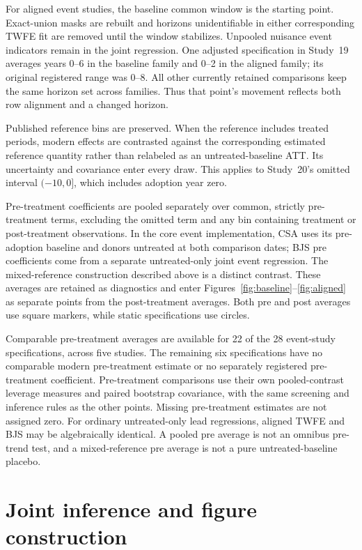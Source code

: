 \documentclass[11pt,letterpaper]{article}
\begin{document}
For aligned event studies, the baseline common window is the starting point. Exact-union masks are rebuilt and horizons unidentifiable in either corresponding TWFE fit are removed until the window stabilizes. Unpooled nuisance event indicators remain in the joint regression. One adjusted specification in Study~19 averages years 0--6 in the baseline family and 0--2 in the aligned family; its original registered range was 0--8. All other currently retained comparisons keep the same horizon set across families. Thus that point's movement reflects both row alignment and a changed horizon.

Published reference bins are preserved. When the reference includes treated periods, modern effects are contrasted against the corresponding estimated reference quantity rather than relabeled as an untreated-baseline ATT. Its uncertainty and covariance enter every draw. This applies to Study~20's omitted interval $(-10,0]$, which includes adoption year zero.

Pre-treatment coefficients are pooled separately over common, strictly pre-treatment terms, excluding the omitted term and any bin containing treatment or post-treatment observations. In the core event implementation, CSA uses its pre-adoption baseline and donors untreated at both comparison dates; BJS pre coefficients come from a separate untreated-only joint event regression. The mixed-reference construction described above is a distinct contrast. These averages are retained as diagnostics and enter Figures~\ref{fig:baseline}--\ref{fig:aligned} as separate points from the post-treatment averages. Both pre and post averages use square markers, while static specifications use circles.

Comparable pre-treatment averages are available for 22 of the 28 event-study specifications, across five studies. The remaining six specifications have no comparable modern pre-treatment estimate or no separately registered pre-treatment coefficient. Pre-treatment comparisons use their own pooled-contrast leverage measures and paired bootstrap covariance, with the same screening and inference rules as the other points. Missing pre-treatment estimates are not assigned zero. For ordinary untreated-only lead regressions, aligned TWFE and BJS may be algebraically identical. A pooled pre average is not an omnibus pre-trend test, and a mixed-reference pre average is not a pure untreated-baseline placebo.

\section{Joint inference and figure construction}
\label{app:inference}
\end{document}

